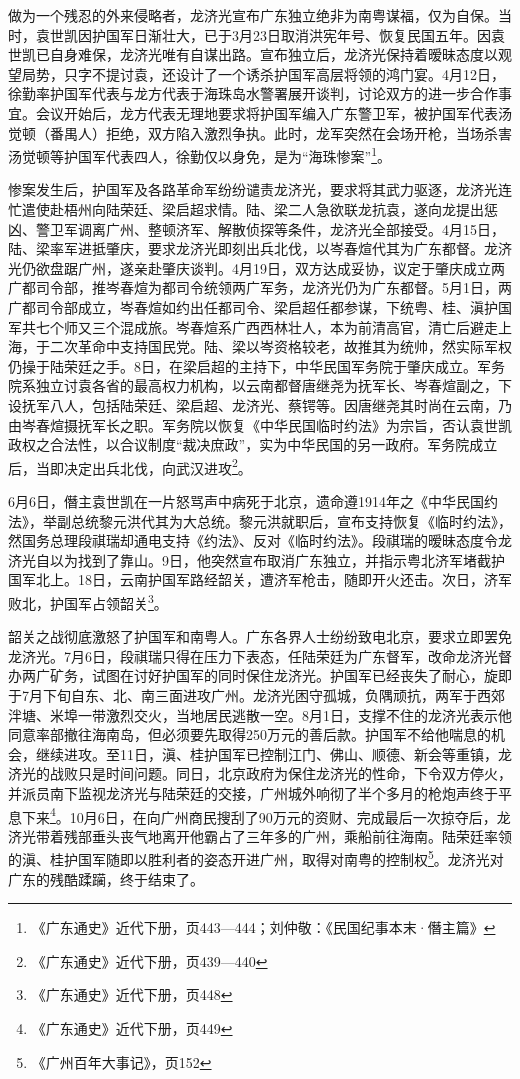 做为一个残忍的外来侵略者，龙济光宣布广东独立绝非为南粤谋福，仅为自保。当时，袁世凯因护国军日渐壮大，已于3月23日取消洪宪年号、恢复民国五年。因袁世凯已自身难保，龙济光唯有自谋出路。宣布独立后，龙济光保持着暧昧态度以观望局势，只字不提讨袁，还设计了一个诱杀护国军高层将领的鸿门宴。4月12日，徐勤率护国军代表与龙方代表于海珠岛水警署展开谈判，讨论双方的进一步合作事宜。会议开始后，龙方代表无理地要求将护国军编入广东警卫军，被护国军代表汤觉顿（番禺人）拒绝，双方陷入激烈争执。此时，龙军突然在会场开枪，当场杀害汤觉顿等护国军代表四人，徐勤仅以身免，是为“海珠惨案”\footnote{《广东通史》近代下册，页443—444；刘仲敬：《民国纪事本末·僭主篇》}。

惨案发生后，护国军及各路革命军纷纷谴责龙济光，要求将其武力驱逐，龙济光连忙遣使赴梧州向陆荣廷、梁启超求情。陆、梁二人急欲联龙抗袁，遂向龙提出惩凶、警卫军调离广州、整顿济军、解散侦探等条件，龙济光全部接受。4月15日，陆、梁率军进抵肇庆，要求龙济光即刻出兵北伐，以岑春煊代其为广东都督。龙济光仍欲盘踞广州，遂亲赴肇庆谈判。4月19日，双方达成妥协，议定于肇庆成立两广都司令部，推岑春煊为都司令统领两广军务，龙济光仍为广东都督。5月1日，两广都司令部成立，岑春煊如约出任都司令、梁启超任都参谋，下统粤、桂、滇护国军共七个师又三个混成旅。岑春煊系广西西林壮人，本为前清高官，清亡后避走上海，于二次革命中支持国民党。陆、梁以岑资格较老，故推其为统帅，然实际军权仍操于陆荣廷之手。8日，在梁启超的主持下，中华民国军务院于肇庆成立。军务院系独立讨袁各省的最高权力机构，以云南都督唐继尧为抚军长、岑春煊副之，下设抚军八人，包括陆荣廷、梁启超、龙济光、蔡锷等。因唐继尧其时尚在云南，乃由岑春煊摄抚军长之职。军务院以恢复《中华民国临时约法》为宗旨，否认袁世凯政权之合法性，以合议制度“裁决庶政”，实为中华民国的另一政府。军务院成立后，当即决定出兵北伐，向武汉进攻\footnote{《广东通史》近代下册，页439—440}。

6月6日，僭主袁世凯在一片怒骂声中病死于北京，遗命遵1914年之《中华民国约法》，举副总统黎元洪代其为大总统。黎元洪就职后，宣布支持恢复《临时约法》，然国务总理段祺瑞却通电支持《约法》、反对《临时约法》。段祺瑞的暧昧态度令龙济光自以为找到了靠山。9日，他突然宣布取消广东独立，并指示粤北济军堵截护国军北上。18日，云南护国军路经韶关，遭济军枪击，随即开火还击。次日，济军败北，护国军占领韶关\footnote{《广东通史》近代下册，页448}。

韶关之战彻底激怒了护国军和南粤人。广东各界人士纷纷致电北京，要求立即罢免龙济光。7月6日，段祺瑞只得在压力下表态，任陆荣廷为广东督军，改命龙济光督办两广矿务，试图在讨好护国军的同时保住龙济光。护国军已经丧失了耐心，旋即于7月下旬自东、北、南三面进攻广州。龙济光困守孤城，负隅顽抗，两军于西郊泮塘、米埠一带激烈交火，当地居民逃散一空。8月1日，支撑不住的龙济光表示他同意率部撤往海南岛，但必须要先取得250万元的善后款。护国军不给他喘息的机会，继续进攻。至11日，滇、桂护国军已控制江门、佛山、顺德、新会等重镇，龙济光的战败只是时间问题。同日，北京政府为保住龙济光的性命，下令双方停火，并派员南下监视龙济光与陆荣廷的交接，广州城外响彻了半个多月的枪炮声终于平息下来\footnote{《广东通史》近代下册，页449}。10月6日，在向广州商民搜刮了90万元的资财、完成最后一次掠夺后，龙济光带着残部垂头丧气地离开他霸占了三年多的广州，乘船前往海南。陆荣廷率领的滇、桂护国军随即以胜利者的姿态开进广州，取得对南粤的控制权\footnote{《广州百年大事记》，页152}。龙济光对广东的残酷蹂躏，终于结束了。

